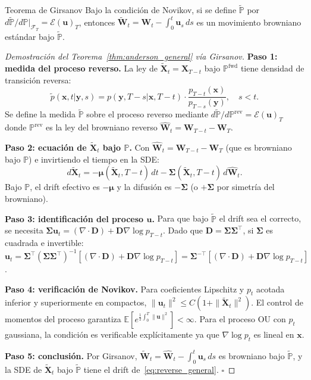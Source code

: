 \begin{teorema}{Teorema de Girsanov}
\label{thm:girsanov}
Bajo la condición de Novikov, si se define $\tilde{\mathbb{P}}$ por
$d\tilde{\mathbb{P}}/d\mathbb{P}|_{\mathcal{F}_T} = \mathcal{E}(\bm{u})_T$,
entonces $\tilde{\bm{W}}_t = \bm{W}_t - \int_0^t\bm{u}_s\,ds$ es un
movimiento browniano estándar bajo $\tilde{\mathbb{P}}$.
\end{teorema}

\begin{proof}[Demostración del Teorema~\ref{thm:anderson_general} vía Girsanov]
\textbf{Paso 1: medida del proceso reverso.}
La ley de $\tilde{\bm{X}}_t = \bm{X}_{T-t}$ bajo $\mathbb{P}^{\mathrm{fwd}}$
tiene densidad de transición reversa:
\[
  \tilde{p}(\bm{x},t|\bm{y},s) = p(\bm{y},T-s|\bm{x},T-t)
  \cdot\frac{p_{T-t}(\bm{x})}{p_{T-s}(\bm{y})}, \quad s < t.
\]
Se define la medida $\tilde{\mathbb{P}}$ sobre el proceso reverso mediante
$d\tilde{\mathbb{P}}/d\mathbb{P}^{\mathrm{rev}} = \mathcal{E}(\bm{u})_T$
donde $\mathbb{P}^{\mathrm{rev}}$ es la ley del browniano reverso
$\hat{\bm{W}}_t = \bm{W}_{T-t}-\bm{W}_T$.

\textbf{Paso 2: ecuación de $\tilde{\bm{X}}_t$ bajo $\mathbb{P}$.}
Con $\hat{\bm{W}}_t = \bm{W}_{T-t}-\bm{W}_T$ (que es browniano bajo $\mathbb{P}$)
e invirtiendo el tiempo en la SDE:
\[
  d\tilde{\bm{X}}_t = -\bm{\mu}(\tilde{\bm{X}}_t,T{-}t)\,dt
  - \bm{\Sigma}(\tilde{\bm{X}}_t,T{-}t)\,d\hat{\bm{W}}_t.
\]
Bajo $\mathbb{P}$, el drift efectivo es $-\bm{\mu}$ y la difusión es $-\bm{\Sigma}$
(o $+\bm{\Sigma}$ por simetría del browniano).

\textbf{Paso 3: identificación del proceso $\bm{u}$.}
Para que bajo $\tilde{\mathbb{P}}$ el drift sea el correcto, se necesita
$\bm{\Sigma}\bm{u}_t = (\nabla\cdot\bm{D}) + \bm{D}\nabla\log p_{T-t}$.
Dado que $\bm{D} = \bm{\Sigma}\bm{\Sigma}^\top$, si $\bm{\Sigma}$ es
cuadrada e invertible: $\bm{u}_t = \bm{\Sigma}^\top(\bm{\Sigma}\bm{\Sigma}^\top)^{-1}
[(\nabla\cdot\bm{D}) + \bm{D}\nabla\log p_{T-t}] = \bm{\Sigma}^{-\top}
[(\nabla\cdot\bm{D}) + \bm{D}\nabla\log p_{T-t}]$.

\textbf{Paso 4: verificación de Novikov.}
Para coeficientes Lipschitz y $p_t$ acotada inferior y superiormente en compactos,
$\|\bm{u}_t\|^2 \leq C(1+\|\tilde{\bm{X}}_t\|^2)$. El control de momentos del
proceso garantiza $\mathbb{E}[e^{\frac{1}{2}\int_0^T\|\bm{u}\|^2}] < \infty$.
Para el proceso OU con $p_t$ gaussiana, la condición es verificable explícitamente
ya que $\nabla\log p_t$ es lineal en $\bm{x}$.

\textbf{Paso 5: conclusión.}
Por Girsanov, $\tilde{\bm{W}}_t = \hat{\bm{W}}_t - \int_0^t\bm{u}_s\,ds$ es
browniano bajo $\tilde{\mathbb{P}}$, y la SDE de $\tilde{\bm{X}}_t$ bajo
$\tilde{\mathbb{P}}$ tiene el drift de~\eqref{eq:reverse_general}. $\square$
\end{proof}

